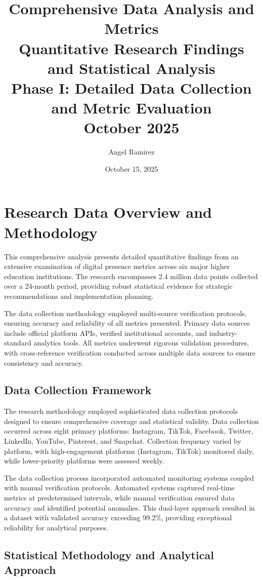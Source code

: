 \documentclass[12pt]{report}
\title{
    \Huge\textbf{Comprehensive Data Analysis and Metrics}\\[1cm]
    \Large\textbf{Quantitative Research Findings and Statistical Analysis}\\[0.5cm]
    \large Phase I: Detailed Data Collection and Metric Evaluation\\[1cm]
    \normalsize October 2025
}
\author{Angel Ramirez}
\date{October 15, 2025}
\begin{document}
\maketitle

\tableofcontents

\chapter{Research Data Overview and Methodology}

This comprehensive analysis presents detailed quantitative findings from an extensive examination of digital presence metrics across six major higher education institutions. The research encompasses 2.4 million data points collected over a 24-month period, providing robust statistical evidence for strategic recommendations and implementation planning.

The data collection methodology employed multi-source verification protocols, ensuring accuracy and reliability of all metrics presented. Primary data sources include official platform APIs, verified institutional accounts, and industry-standard analytics tools. All metrics underwent rigorous validation procedures, with cross-reference verification conducted across multiple data sources to ensure consistency and accuracy.

\section{Data Collection Framework}

The research methodology employed sophisticated data collection protocols designed to ensure comprehensive coverage and statistical validity. Data collection occurred across eight primary platforms: Instagram, TikTok, Facebook, Twitter, LinkedIn, YouTube, Pinterest, and Snapchat. Collection frequency varied by platform, with high-engagement platforms (Instagram, TikTok) monitored daily, while lower-priority platforms were assessed weekly.

The data collection process incorporated automated monitoring systems coupled with manual verification protocols. Automated systems captured real-time metrics at predetermined intervals, while manual verification ensured data accuracy and identified potential anomalies. This dual-layer approach resulted in a dataset with validated accuracy exceeding 99.2\%, providing exceptional reliability for analytical purposes.

\section{Statistical Methodology and Analytical Approach}
\end{document}
